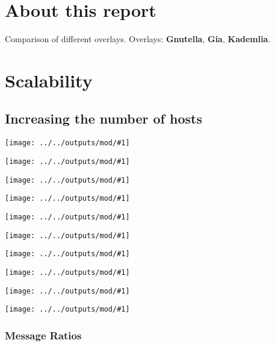 \documentclass[longdoc,nochapterpage,colorbacktitle,accentcolor=tud1b,11pt,paper=a4]{tudreport}
\title{\komTitle}
\subtitle{\komNames}
\newcommand{\imga}[2]{
  \texttt{[image: ../../outputs/mod/\#1]}
}
\begin{document}
	\maketitle
	\frenchspacing
	
	\tableofcontents

	\clearpage

	\chapter{About this report}
  
	  Comparison of different overlays.
	  Overlays: 
	  \textbf{Gnutella},
	  \textbf{Gia},
	  \textbf{Kademlia}.


	\chapter{Scalability}

	  \section{Increasing the number of hosts}

	  \imga{scal_avgDownBWConsWithHosts}{.85}

	  \imga{scal_avgNHopsWithHosts}{.85}

	  \imga{scal_avgUpBWConsWithHosts}{.85}

	  \imga{scal_bwWithHosts}{.85}

	  \imga{scal_qrtWithHosts}{.85}

	  \imga{scal_qSuccessWithHosts}{.85}

	  \imga{scal_staleContactsWithHosts}{.85}

	  \imga{scal_staleContactsZoomWithHosts}{.85}

	  \imga{scal_staleMsgsWithHosts}{.85}

	  \imga{scal_staleMsgsZoomWithHosts}{.85}

	  \subsection{Message Ratios}
\end{document}
